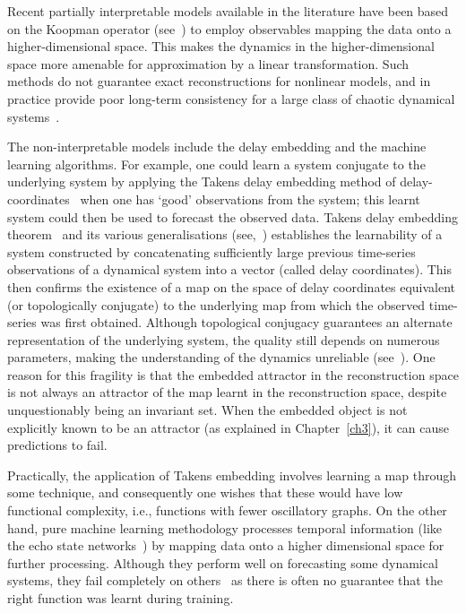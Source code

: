 Recent partially interpretable models available in the literature have been based on the Koopman operator (see~\cite{koopman1932dynamical,budivsic2012applied}) to employ observables mapping the data onto a higher-dimensional space. This makes the dynamics in the higher-dimensional space more amenable for approximation by a linear transformation. Such methods do not guarantee exact reconstructions for nonlinear models, and in practice provide poor long-term consistency for a large class of chaotic dynamical systems~\cite{Supp}.

The non-interpretable models include the delay embedding and the machine learning algorithms. For example, one could learn a system conjugate to the underlying system by applying the Takens delay embedding method of delay-coordinates~\cite{takens1981detecting} when one has `good' observations from the system; this learnt system could then be used to forecast the observed data. 
Takens delay embedding theorem~\cite{takens1981detecting} and its various generalisations (see,~\cite{sauer1991embedology, stark1999delay, gutman2018embedding}) establishes the learnability of a system constructed by concatenating sufficiently large previous time-series observations of a dynamical system into a vector (called delay coordinates). This then confirms the existence of a map on the space of delay coordinates equivalent (or topologically conjugate) to the underlying map from which the observed time-series was first obtained. Although topological conjugacy guarantees an alternate representation of the underlying system, the quality still depends on numerous parameters, making the understanding of the dynamics unreliable (see~\cite{principe1992prediction}). One reason for this fragility is that the embedded attractor in the reconstruction space is not always an attractor of the map learnt in the reconstruction space, despite unquestionably being an invariant set. When the embedded object is not explicitly known to be an attractor (as explained in Chapter~\ref{ch3}), it can cause predictions to fail.

Practically, the application of Takens embedding involves learning a map through some technique, and consequently one wishes that these would have low functional complexity\cite{manjunath2021universal}, i.e., functions with fewer oscillatory graphs. On the other hand, pure machine learning methodology processes temporal information (like the echo state networks~\cite{Manju_ESP, Manju_IEEE, grigoryeva2018echo}) by mapping data onto a higher dimensional space for further processing. Although they perform  well on forecasting some dynamical systems, they fail completely on others~\cite{Supp} as there is often no guarantee that the right function was learnt during training.

